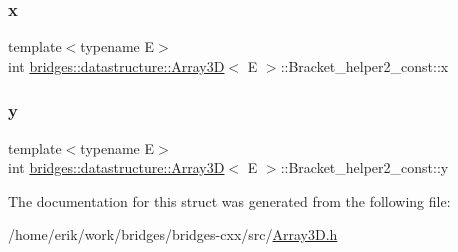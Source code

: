 \subsubsection{\texorpdfstring{x}{x}}
{\footnotesize\ttfamily template$<$typename E$>$ \\
int \hyperlink{classbridges_1_1datastructure_1_1_array3_d}{bridges\+::datastructure\+::\+Array3D}$<$ E $>$\+::Bracket\+\_\+helper2\+\_\+const\+::x}

\mbox{\label{structbridges_1_1datastructure_1_1_array3_d_1_1_bracket__helper2__const_a5c76d396209c5060f72c321d2b70e707}} 
\subsubsection{\texorpdfstring{y}{y}}
{\footnotesize\ttfamily template$<$typename E$>$ \\
int \hyperlink{classbridges_1_1datastructure_1_1_array3_d}{bridges\+::datastructure\+::\+Array3D}$<$ E $>$\+::Bracket\+\_\+helper2\+\_\+const\+::y}



The documentation for this struct was generated from the following file\+:\begin{DoxyCompactItemize}
\item 
/home/erik/work/bridges/bridges-\/cxx/src/\hyperlink{_array3_d_8h}{Array3\+D.\+h}\end{DoxyCompactItemize}
